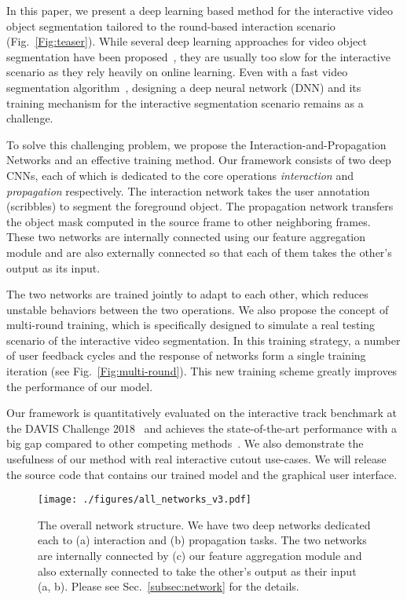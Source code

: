 \documentclass[10pt,twocolumn,letterpaper]{article}
\newcommand{\fref}[1]{Fig.~\ref{#1}}
\newcommand{\sref}[1]{Sec.~\ref{#1}}
\begin{document}
In this paper, we present a deep learning based method for the interactive video object segmentation
tailored to the round-based interaction scenario (\fref{Fig:teaser}).
While several deep learning approaches for video object segmentation have been proposed~\cite{caelles2017one, perazzi2017learning}, they are usually too slow for the interactive scenario as they rely heavily on online learning.
Even with a fast video segmentation algorithm~\cite{oh2018fast}, designing a deep neural network (DNN) and its training mechanism for the interactive segmentation scenario remains as a challenge.

To solve this challenging problem, we propose the Interaction-and-Propagation Networks and an effective training method.
Our framework consists of two deep CNNs, each of which is dedicated to the core operations \textit{interaction} and \textit{propagation} respectively.
The interaction network takes the user annotation (\eg scribbles) to segment the foreground object. The propagation network transfers the object mask computed in the source frame to other neighboring frames.
These two networks are internally connected using our feature aggregation module and are also externally connected so that each of them takes the other's output as its input.



The two networks are trained jointly to adapt to each other, which reduces unstable behaviors between the two operations.
We also propose the concept of multi-round training, which is specifically designed to simulate a real testing scenario of the interactive video segmentation.
In this training strategy, a number of user feedback cycles and the response of networks form a single training iteration (see \fref{Fig:multi-round}). This new training scheme greatly improves the performance of our model. 

Our framework is quantitatively evaluated on the interactive track benchmark at the DAVIS Challenge 2018~\cite{caelles20182018} and achieves the state-of-the-art performance with a big gap compared to other competing methods~\cite{DAVIS2018-Interactive-1st}.
We also demonstrate the usefulness of our method with real interactive cutout use-cases.
We will release the source code that contains our trained model and the graphical user interface.


\begin{figure*}
\centering
\texttt{[image: ./figures/all\_networks\_v3.pdf]}
\caption{The overall network structure. We have two deep networks dedicated each to (a) interaction and (b) propagation tasks. The two networks are internally connected by (c) our feature aggregation module and also externally connected to take the other's output as their input (a, b). Please see \sref{subsec:network} for the details.}
\label{Fig:networks}
\end{figure*}
\end{document}
